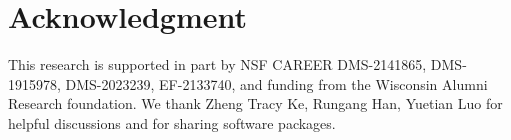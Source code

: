 \documentclass[journal]{IEEEtran}
\theoremstyle{definition}
\theoremstyle{definition}
\begin{document}
\section*{Acknowledgment}

This research is supported in part by NSF CAREER DMS-2141865, DMS-1915978, DMS-2023239, EF-2133740, and funding from the Wisconsin Alumni Research foundation. We thank Zheng Tracy Ke, Rungang Han, Yuetian Luo for helpful discussions and for sharing software packages. 


\ifCLASSOPTIONcaptionsoff
  \newpage
\fi





%
%
%






% 
\end{document}
